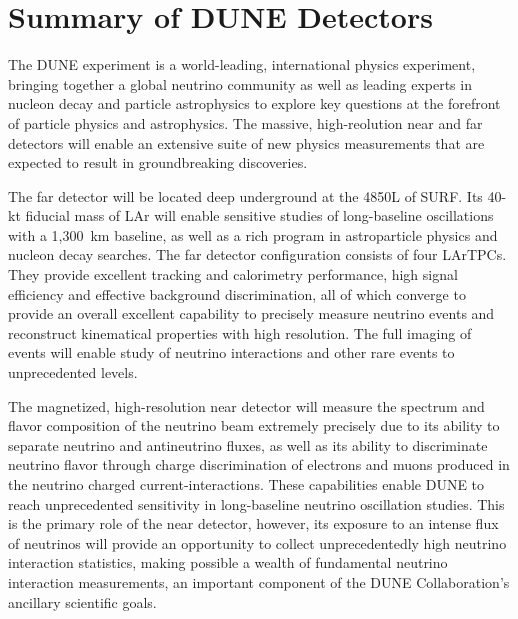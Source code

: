 \chapter{Summary of DUNE Detectors}
\label{ch:detectors-summary}

The DUNE experiment is a world-leading, international physics
experiment, bringing together a global neutrino community as well as
leading experts in nucleon decay and particle astrophysics to explore
key questions at the forefront of particle physics and
astrophysics. The massive, high-reolution near and far detectors will
enable an extensive suite of new physics measurements that are
expected to result in groundbreaking discoveries.

The far detector will be located deep underground at the 4850L of
SURF.  Its 40-kt fiducial mass of LAr will enable sensitive studies of
long-baseline oscillations with a 1,300~km baseline, as well as a rich
program in astroparticle physics and nucleon decay searches.  The far
detector configuration consists of four LArTPCs.  They provide
excellent tracking and calorimetry performance, high signal efficiency
and effective background discrimination, all of which converge to
provide an overall excellent capability to precisely measure neutrino
events and reconstruct kinematical properties with high
resolution. The full imaging of events will enable study of neutrino
interactions and other rare events to unprecedented levels.


The magnetized, high-resolution near detector will measure the
spectrum and flavor composition of the neutrino beam extremely
precisely due to its ability to separate neutrino and antineutrino
fluxes, as well as its ability to discriminate neutrino flavor through
charge discrimination of electrons and muons produced in the neutrino
charged current-interactions. These capabilities  enable DUNE to reach unprecedented
sensitivity in long-baseline neutrino oscillation studies.  This
is the primary role of the near detector, however, its exposure to an
intense flux of neutrinos will provide an opportunity to collect
unprecedentedly high neutrino interaction statistics, making possible
a wealth of fundamental neutrino interaction measurements, an
important component of the DUNE Collaboration's ancillary scientific
goals.

